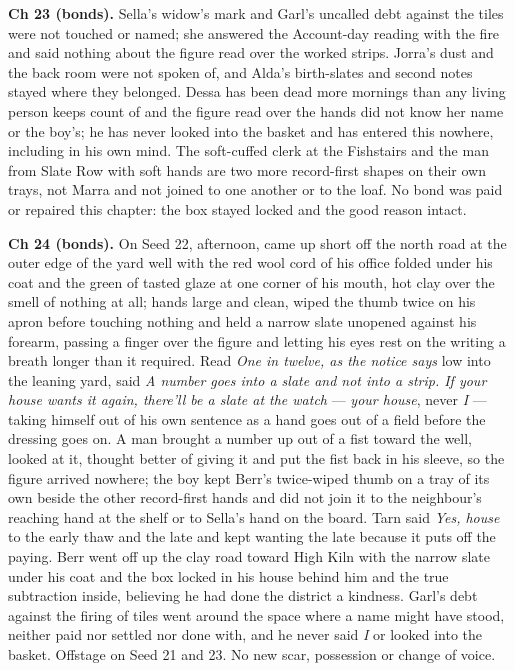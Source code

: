 \documentclass{design/chronicle}
\begin{document}
{\textbf{Ch 23 (bonds).} Sella’s widow’s mark and Garl’s uncalled debt against the tiles were not touched or named; she answered the Account-day reading with the fire and said nothing about the figure read over the worked strips. Jorra’s dust and the back room were not spoken of, and Alda’s birth-slates and second notes stayed where they belonged. Dessa has been dead more mornings than any living person keeps count of and the figure read over the hands did not know her name or the boy’s; he has never looked into the basket and has entered this nowhere, including in his own mind. The soft-cuffed clerk at the Fishstairs and the man from Slate Row with soft hands are two more record-first shapes on their own trays, not Marra and not joined to one another or to the loaf. No bond was paid or repaired this chapter: the box stayed locked and the good reason intact.

\textbf{Ch 24 (bonds).} On Seed 22, afternoon, came up short off the north road at the outer edge of the yard well with the red wool cord of his office folded under his coat and the green of tasted glaze at one corner of his mouth, hot clay over the smell of nothing at all; hands large and clean, wiped the thumb twice on his apron before touching nothing and held a narrow slate unopened against his forearm, passing a finger over the figure and letting his eyes rest on the writing a breath longer than it required. Read \emph{One in twelve, as the notice says} low into the leaning yard, said \emph{A number goes into a slate and not into a strip. If your house wants it again, there’ll be a slate at the watch} — \emph{your house}, never \emph{I} — taking himself out of his own sentence as a hand goes out of a field before the dressing goes on. A man brought a number up out of a fist toward the well, looked at it, thought better of giving it and put the fist back in his sleeve, so the figure arrived nowhere; the boy kept Berr’s twice-wiped thumb on a tray of its own beside the other record-first hands and did not join it to the neighbour’s reaching hand at the shelf or to Sella’s hand on the board. Tarn said \emph{Yes, house} to the early thaw and the late and kept wanting the late because it puts off the paying. Berr went off up the clay road toward High Kiln with the narrow slate under his coat and the box locked in his house behind him and the true subtraction inside, believing he had done the district a kindness. Garl’s debt against the firing of tiles went around the space where a name might have stood, neither paid nor settled nor done with, and he never said \emph{I} or looked into the basket. Offstage on Seed 21 and 23. No new scar, possession or change of voice.

}
\end{document}
